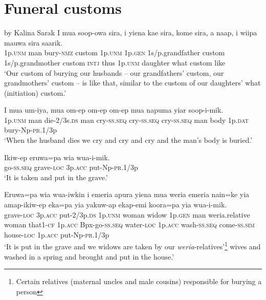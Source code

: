\section{Funeral customs}\label{app:2:funeral}
by Kalina Sarak
\ea
\gll  I  mua  soop-owa  sira,  i  yiena  kae  sira,                    kome  sira,  a  naap,  i  wiipa  mauwa  sira  saarik. \\
1p.\textsc{unm}  man  bury-\textsc{nmz}  custom  1p.\textsc{unm}  1p.\textsc{gen}  1s/p.grandfather  custom 1s/p.grandmother  custom  \textsc{intj}  thus  1p.\textsc{unm}  daughter  what  custom  like \\


\glt ‘Our custom of burying our husbands – our grandfathers’ custom, our grandmothers’ custom – is like that, similar to the custom of our daughters’ what (initiation) custom.’ \\
\z


\ea
\gll  I  mua  um-iya,  mua  om-ep  om-ep  om-ep  mua                    napuma  yiar  soop-i-mik. \\
1p.\textsc{unm}  man  die-2/3s.\textsc{ds}  man  cry-\textsc{ss.seq}  cry-\textsc{ss.seq}  cry-\textsc{ss.seq}  man  body  1p.\textsc{dat}  bury-Np-\textsc{pr}.1/3p \\


\glt ‘When the husband dies we cry and cry and cry and the man’s body is buried.’ \\
\z


\ea
\gll  Ikiw-ep  eruwa=pa  wia  wua-i-mik. \\
go-\textsc{ss.seq}  grave-\textsc{loc}  3p.\textsc{acc}  put-Np-\textsc{pr}.1/3p \\
\glt ‘It is taken and put in the grave.’ \\
\z


\ea
\gll  Eruwa=pa  wia  wua-iwkin  i  emeria  apura  yiena      mua  weria  emeria  nain=ke  yia  amap-ikiw-ep  eka=pa                  yia  yakuw-ap  ekap-emi  koora=pa  yia  wua-i-mik. \\
grave-\textsc{loc}  3p.\textsc{acc}  put-2/3p.\textsc{ds}  1p.\textsc{unm}  woman  widow  1p.\textsc{gen} man  weria.relative  woman  that1-\textsc{cf}  1p.\textsc{acc}  Bpx-go-\textsc{ss.seq}  water-\textsc{loc}  1p.\textsc{acc}  wash-\textsc{ss.seq}  come-\textsc{ss}.\textsc{sim}  house-\textsc{loc}  1p.\textsc{acc}  put-Np-\textsc{pr}.1/3p \\




\glt ‘It is put in the grave and we widows are taken by our \textit{weria}{}-relatives’\footnote{ Certain relatives (maternal uncles and male cousins) responsible for burying a person} wives and washed in a spring and brought and put in the house.’ \\
\z



